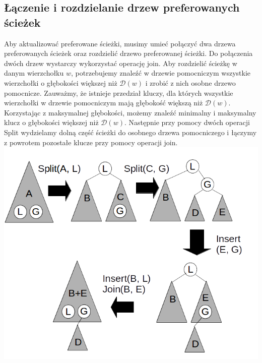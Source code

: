 \documentclass[declaration,shortabstract]{iithesis}
\theoremstyle{thm}
\theoremstyle{remark}
\theoremstyle{plain}
\theoremstyle{plain}
\theoremstyle{plain}
\begin{document}
\subsection{Łączenie i rozdzielanie drzew preferowanych ścieżek} 
Aby aktualizować preferowane ścieżki, musimy umieć połączyć dwa drzewa preferowanych ścieżek oraz rozdzielić drzewo preferowanej ścieżki. Do połączenia dwóch drzew wystarczy wykorzystać operację join. Aby rozdzielić ścieżkę w danym wierzchołku $w$, potrzebujemy znaleźć w drzewie pomocniczym wszystkie wierzchołki o głębokości większej niż \(\mathcal{D}(w)\) i zrobić z nich osobne drzewo pomocnicze. Zauważmy, że istnieje przedział kluczy, dla których wszystkie wierzchołki w drzewie pomocniczym mają głębokość większą niż \(\mathcal{D}(w)\). Korzystając z maksymalnej głębokości, możemy znaleźć minimalny i maksymalny klucz o głębokości większej niż \(\mathcal{D}(w)\). Następnie przy pomocy dwóch operacji Split wydzielamy dolną część ścieżki do osobnego drzewa pomocniczego i łączymy z powrotem pozostałe klucze przy pomocy operacji join.\\ 
\includegraphics[scale=0.45]{rozdzielanie.png} 
\end{document}
